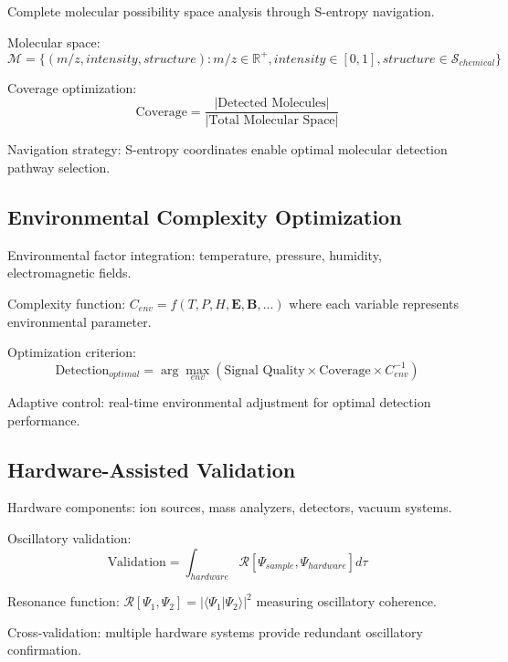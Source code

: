 \documentclass[12pt,a4paper]{article}
\begin{document}
Complete molecular possibility space analysis through S-entropy navigation.

Molecular space:
\begin{equation}
\mathcal{M} = \{(m/z, intensity, structure) : m/z \in \mathbb{R}^+, intensity \in [0,1], structure \in \mathcal{S}_{chemical}\}
\end{equation}

Coverage optimization:
\begin{equation}
\text{Coverage} = \frac{|\text{Detected Molecules}|}{|\text{Total Molecular Space}|}
\end{equation}

Navigation strategy: S-entropy coordinates enable optimal molecular detection pathway selection.

\subsection{Environmental Complexity Optimization}

Environmental factor integration: temperature, pressure, humidity, electromagnetic fields.

Complexity function: $C_{env} = f(T, P, H, \mathbf{E}, \mathbf{B}, ...)$ where each variable represents environmental parameter.

Optimization criterion:
\begin{equation}
\text{Detection}_{optimal} = \arg \max_{env} \left( \text{Signal Quality} \times \text{Coverage} \times C_{env}^{-1} \right)
\end{equation}

Adaptive control: real-time environmental adjustment for optimal detection performance.

\subsection{Hardware-Assisted Validation}

Hardware components: ion sources, mass analyzers, detectors, vacuum systems.

Oscillatory validation:
\begin{equation}
\text{Validation} = \int_{hardware} \mathcal{R}[\Psi_{sample}, \Psi_{hardware}] d\tau
\end{equation}

Resonance function: $\mathcal{R}[\Psi_1, \Psi_2] = |\langle \Psi_1 | \Psi_2 \rangle|^2$ measuring oscillatory coherence.

Cross-validation: multiple hardware systems provide redundant oscillatory confirmation.
\end{document}
